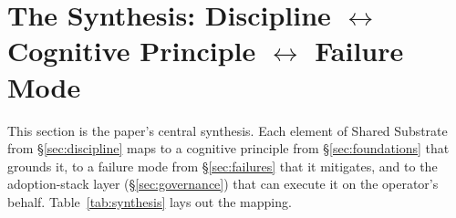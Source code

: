 \documentclass[11pt,a4paper,twocolumn]{article}
\begin{document}
\section{The Synthesis: Discipline $\leftrightarrow$ Cognitive Principle $\leftrightarrow$ Failure Mode}
\label{sec:synthesis}

This section is the paper's central synthesis. Each element of
Shared Substrate from \S\ref{sec:discipline} maps to a
cognitive principle from \S\ref{sec:foundations} that grounds it,
to a failure mode from \S\ref{sec:failures} that it mitigates, and
to the adoption-stack layer (\S\ref{sec:governance}) that can
execute it on the operator's behalf.
Table~\ref{tab:synthesis} lays out the mapping.
\end{document}
